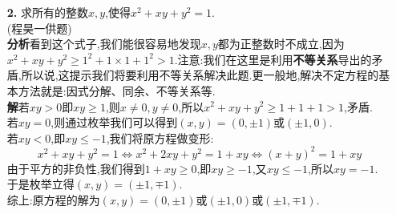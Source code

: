 \documentclass[UTF8]{ctexart}
\begin{document}
\begin{itemize}
\item[\textbf{2.}]{求所有的整数$x,y$,使得$x^2+xy+y^2=1$.\\
(程昊一供题)}\\
\hspace*{2em}\textbf{分析}\quad 看到这个式子,我们能很容易地发现$x,y$都为正整数时不成立,因为$x^2+xy+y^2\ge 1^2+1\times 1+1^2>1$.注意:我们在这里是利用\textbf{不等关系}导出的矛盾,所以说,这提示我们将要利用不等关系解决此题.更一般地,解决不定方程的基本方法就是:因式分解、同余、不等关系等.\\
\hspace*{2em}\textbf{解}\quad 若$xy>0$即$xy\ge1$,则$x\neq0,y\neq 0$,所以$x^2+xy+y^2\ge 1+1+1>1$,矛盾.\\
\hspace*{2em}若$xy=0$,则通过枚举我们可以得到$(x,y)=(0,\pm1)或(\pm1,0)$.\\
\hspace*{2em}若$xy<0$,即$xy\le-1$,我们将原方程做变形:
\[x^2+xy+y^2=1\Leftrightarrow x^2+2xy+y^2=1+xy\Leftrightarrow (x+y)^2=1+xy\]
由于平方的非负性,我们得到$1+xy\ge0$,即$xy\ge-1$,又$xy\le-1$,所以$xy=-1$.\\
于是枚举立得$(x,y)=(\pm1,\mp1)$.\\
\hspace*{2em}综上:原方程的解为$(x,y)=(0,\pm1)$或$(\pm1,0)$或$(\pm1,\mp1)$.


\end{itemize}
\end{document}
